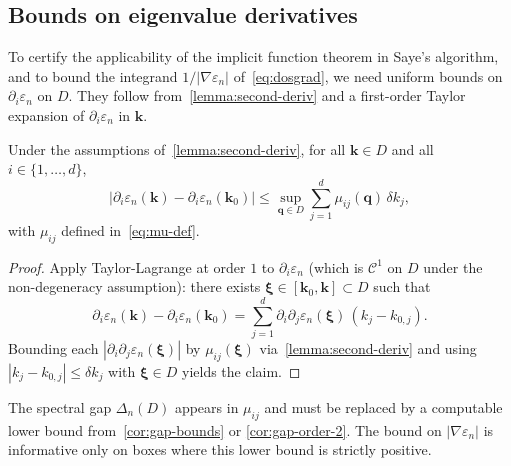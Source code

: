 \documentclass[11pt]{article}
\numberwithin{equation}{section}
\begin{document}
\subsection{Bounds on eigenvalue derivatives}\label{sec:bounds-derivatives-nondegen}

To certify the applicability of the implicit function theorem in Saye's
algorithm, and to bound the integrand \(1/|\nabla \varepsilon_n|\)
of~\eqref{eq:dosgrad}, we need uniform bounds on \(\partial_i \varepsilon_n\)
on \(D\). They follow from~\autoref{lemma:second-deriv} and a first-order
Taylor expansion of \(\partial_i \varepsilon_n\) in \(\mathbf{k}\).

\begin{corollary}\label{cor:deriv-bound}
    Under the assumptions of~\autoref{lemma:second-deriv}, for all
    \(\mathbf{k} \in D\) and all \(i \in \{1,\dots,d\}\),
    \begin{equation}
        |\partial_i \varepsilon_n(\mathbf{k}) - \partial_i
        \varepsilon_n(\mathbf{k}_0)|
        \leq \sup_{\mathbf{q} \in D} \sum_{j=1}^d \mu_{ij}(\mathbf{q})\,
        \delta k_j,
    \end{equation}
    with \(\mu_{ij}\) defined in~\eqref{eq:mu-def}.
\end{corollary}

\begin{proof}
    Apply Taylor-Lagrange at order \(1\) to \(\partial_i \varepsilon_n\) (which
    is \(\mathcal{C}^1\) on \(D\) under the non-degeneracy assumption): there
    exists \(\bm\xi \in [\mathbf{k}_0, \mathbf{k}] \subset D\) such that
    \begin{equation}
        \partial_i \varepsilon_n(\mathbf{k}) - \partial_i \varepsilon_n(\mathbf{k}_0)
        = \sum_{j=1}^d \partial_i \partial_j \varepsilon_n(\bm\xi)\,
        (k_j - k_{0,j}).
    \end{equation}
    Bounding each \(|\partial_i \partial_j \varepsilon_n(\bm\xi)|\) by
    \(\mu_{ij}(\bm\xi)\) via~\autoref{lemma:second-deriv} and using
    \(|k_j - k_{0,j}| \leq \delta k_j\) with \(\bm\xi \in D\) yields the claim.
\end{proof}

\begin{remark}
    The spectral gap \(\Delta_n(D)\) appears in \(\mu_{ij}\) and must be
    replaced by a computable lower bound from~\autoref{cor:gap-bounds} or
    \autoref{cor:gap-order-2}. The bound on \(|\nabla \varepsilon_n|\) is
    informative only on boxes where this lower bound is strictly positive.
\end{remark}
\end{document}
